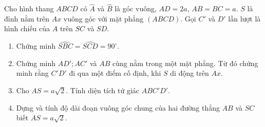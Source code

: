 \begin{bt}%
	Cho hình thang $ABCD$ có $\widehat{A}$ và $\widehat{B}$ là góc vuông, $AD=2a$, $AB=BC=a$. $S$ là đỉnh nằm trên $Ax$ vuông góc với mặt phẳng $(ABCD)$. Gọi $C'$ và $D'$ lần lượt là hình chiếu của $A$ trên $SC$ và $SD$.
	\begin{enumerate}
		\item Chứng minh $\widehat{SBC}=\widehat{SCD}=90^{\circ}$.
		\item Chứng minh $AD';AC'$ và $AB$ cùng nằm trong một mặt phẳng. Từ đó chứng minh rằng $C'D'$ đi qua một điểm cố định, khi $S$ di động trên $Ax$.
		\item Cho $AS=a\sqrt{2}$. Tính diện tích tứ giác $ABC'D'$.
		\item Dựng và tính độ dài đoạn vuông góc chung của hai đường thẳng $AB$ và $SC$ biết $AS=a\sqrt{2}$.
	\end{enumerate}
\end{bt}
